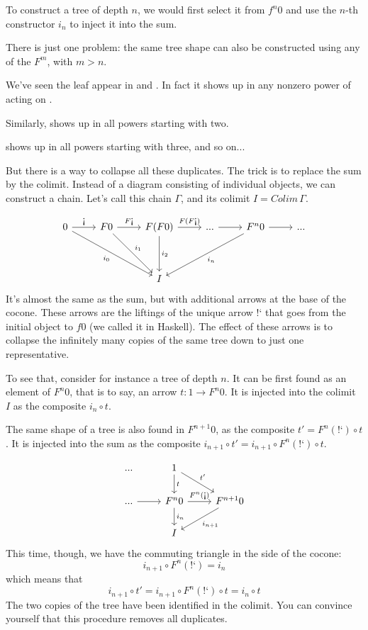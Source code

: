 \documentclass[DaoFP]{subfiles}
\begin{document}
To construct a tree of depth $n$, we would first select it from $f^n 0$ and use the $n$-th constructor $i_n$ to inject it into the sum. 

There is just one problem: the same tree shape can also be constructed using any of the $F^m$, with $m > n$. 

We've seen the leaf  appear in  and . In fact it shows up in any nonzero power of  acting on . 

Similarly,  shows up in all powers starting with two.

 shows up in all powers starting with three, and so on...

But there is a way to collapse all these duplicates. The trick is to replace the sum by the colimit. Instead of a diagram consisting of individual objects, we can construct a chain. Let's call this chain $\Gamma$, and its colimit $I = Colim \, \Gamma$.

\[
 \begin{tikzcd}
 0
 \arrow[r, "\mbox{!`}"]
 \arrow[ddrr, "i_0"']
 & F 0
  \arrow[r, "F\mbox{!`}"]
 \arrow[ddr, "i_1"]
& F (F 0)
  \arrow[r, "F(F\mbox{!`})"]
  \arrow[dd, "i_2"]
 & ...
 \arrow[r]
 & F^n 0
  \arrow[r]
 \arrow[ddll, "i_n"]
 & ...
 \\
 \\
 &&I
  \end{tikzcd}
\]
It's almost the same as the sum, but with additional arrows at the base of the cocone. These arrows are the liftings of the unique arrow $\mbox{!`}$ that goes from the initial object to $f 0$ (we called it  in Haskell). The effect of these arrows is to collapse the infinitely many copies of the same tree down to just one representative. 

To see that, consider for instance a tree of depth $n$. It can be first found as an element of $F^n 0$, that is to say, an arrow $t \colon 1 \to F^n 0$. It is injected into the colimit $I$ as the composite $i_n \circ t$. 

The same shape of a tree is also found in $F^{n+1} 0$, as the composite $t' = F^n (\mbox{!`}) \circ t$. It is injected into the sum as the composite $i_{n+1} \circ t' = i_{n+1} \circ F^n (\mbox{!`}) \circ t$. 

\[
 \begin{tikzcd}
 ...
& 1
\arrow[d, "t"]
\arrow[dr, "t'"]
 \\
 ...
 \arrow[r]
 & F^n 0 
 \arrow[r, "F^n (\mbox{!`})"]
 \arrow[d, "i_n"]
 & F^{n+1} 0
 \arrow[dl, "i_{n+1}"]
 \\
 &  I
  \end{tikzcd}
\]
This time, though, we have the commuting triangle in the side of the cocone:
\[i_{n+1} \circ F^n (\mbox{!`}) = i_n \]
which means that 
\[ i_{n+1} \circ t' =  i_{n+1} \circ F^n (\mbox{!`}) \circ t =  i_n \circ t\]
The two copies of the tree have been identified in the colimit. You can convince yourself that this procedure removes all duplicates.
\end{document}
